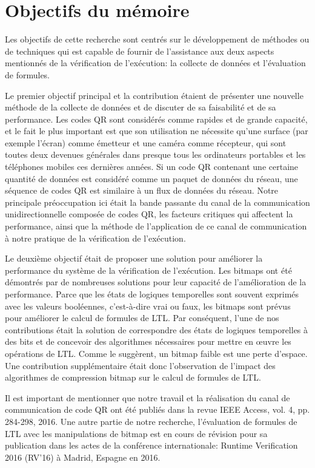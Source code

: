\section{Objectifs du mémoire}

Les objectifs de cette recherche sont centrés sur le développement de méthodes ou de techniques qui est capable de fournir de l'assistance aux deux aspects mentionnés de la vérification de l'exécution: la collecte de données et l'évaluation de formules.

Le premier objectif principal et la contribution étaient de présenter une nouvelle méthode de la collecte de données et de discuter de sa faisabilité et de sa performance. Les codes QR sont considérés comme rapides et de grande capacité, et le fait le plus important est que son utilisation ne nécessite qu'une surface (par exemple l'écran) comme émetteur et une caméra comme récepteur, qui sont toutes deux devenues générales dans presque tous les ordinateurs portables et les téléphones mobiles ces dernières années. Si un code QR contenant une certaine quantité de données est considéré comme un paquet de données du réseau, une séquence de codes QR est similaire à un flux de données du réseau. Notre principale préoccupation ici était la bande passante du canal de la communication unidirectionnelle composée de codes QR, les facteurs critiques qui affectent la performance, ainsi que la méthode de l'application de ce canal de communication à notre pratique de la vérification de l'exécution.

Le deuxième objectif était de proposer une solution pour améliorer la performance du système de la vérification de l'exécution. Les bitmaps ont été démontrés par de nombreuses solutions pour leur capacité de l'amélioration de la performance. Parce que les états de logiques temporelles sont souvent exprimés avec les valeurs booléennes, c'est-à-dire vrai ou faux, les bitmaps sont prévus pour améliorer le calcul de formules de LTL. Par conséquent, l'une de nos contributions était la solution de correspondre des états de logiques temporelles à des bits et de concevoir des algorithmes nécessaires pour mettre en \oe{}uvre les opérations de LTL. Comme \cite{lemire2014} le suggèrent, un bitmap faible est une perte d'espace. Une contribution supplémentaire était donc l'observation de l'impact des algorithmes de compression bitmap sur le calcul de formules de LTL.

Il est important de mentionner que notre travail et la réalisation du canal de communication de code QR ont été publiés dans la revue IEEE Access, vol. 4, pp. 284-298, 2016. Une autre partie de notre recherche, l'évaluation de formules de LTL avec les manipulations de bitmap est en cours de révision pour sa publication dans les actes de la conférence internationale: Runtime Verification 2016 (RV'16) à Madrid, Espagne en 2016.

